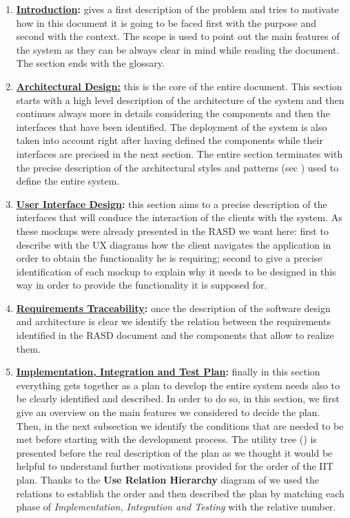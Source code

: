 		\begin{enumerate}
			\item \textbf{\hyperref[sec:introduction]{Introduction}:} gives a first description of the problem and tries to motivate how in this document it is going to be faced first with the purpose and second with the context. The scope is used to point out the main features of the system as they can be always clear in mind while reading the document. The section ends with the glossary.
			
			\item \textbf{\hyperref[sec:architecturalDesign]{Architectural Design:}} this is the core of the entire document. This section starts with a high level description of the architecture of the system and then continues always more in details considering the components and then the interfaces that have been identified. The deployment of the system is also taken into account right after having defined the components while their interfaces are precised in the next section. The entire section terminates with the precise description of the architectural styles and patterns (sec ) used to define the entire system.
			
			\item \textbf{\hyperref[sec:userInterfaceDesign]{User Interface Design}:} this section aims to a precise description of the interfaces that will conduce the interaction of the clients with the system. As these mockups were already presented in the RASD we want here: first to describe with the UX diagrams how the client navigates the application in order to obtain the functionality he is requiring; second to give a precise identification of each mockup to explain why it needs to be designed in this way in order to provide the functionality it is supposed for.
			
			\item \textbf{\hyperref[sec:requirementsTraceability]{Requirements Traceability}:} once the description of the software design and architecture is clear we identify the relation between the requirements identified in the RASD document \cite{RASD} and the components that allow to realize them.
			
			\item \textbf{\hyperref[sec:iitPlan]{Implementation, Integration and Test Plan}:} finally in this section everything gets together as a plan to develop the entire system needs also to be clearly identified and described. In order to do so, in this section, we first give an overview on the main features we considered to decide the plan. Then, in the next subsection we identify the conditions that are needed to be met before starting with the development process. The utility tree () is presented before the real description of the plan as we thought it would be helpful to understand further motivations provided for the order of the IIT plan. Thanks to the \textbf{Use Relation Hierarchy} diagram of  we used the relations to establish the order and then described the plan by matching each phase of \emph{Implementation, Integration and Testing} with the relative number.
			

\end{enumerate}
